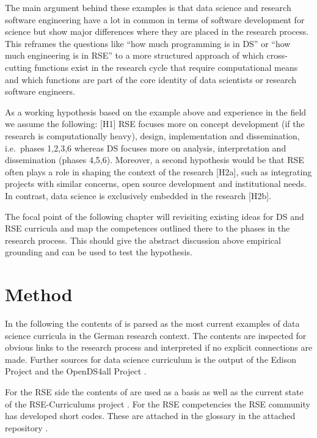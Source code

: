 \documentclass[
        english,biblatex
    ]{lni}
\begin{document}
    The main argument behind these examples is that data science and
    research software engineering have a lot in common in terms of
    software development for science but show major differences where
    they are placed in the research process. This reframes the questions
    like ``how much programming is in DS'' or ``how much engineering is
    in RSE'' to a more structured approach of which cross-cutting
    functions exist in the research cycle that require computational
    means and which functions are part of the core identity of data
    scientists or research software engineers.

    As a working hypothesis based on the example above and experience in
    the field we assume the following: {[}H1{]} RSE focuses more on
    concept development (if the research is computationally heavy),
    design, implementation and dissemination, i.e.~phases 1,2,3,6
    whereas DS focuses more on analysis, interpretation and
    dissemination (phases 4,5,6). Moreover, a second hypothesis would be
    that RSE often plays a role in shaping the context of the research
    {[}H2a{]}, such as integrating projects with similar concerns, open
    source development and institutional needs. In contrast, data
    science is exclusively embedded in the research {[}H2b{]}.

    The focal point of the following chapter will revisiting existing
    ideas for DS and RSE curricula and map the competences outlined
    there to the phases in the research process. This should give the
    abstract discussion above empirical grounding and can be used to
    test the hypothesis.

    \section{Method}\label{method}

    In the following the contents of \autocite{GI2021DataScience} is
    parsed as the most current examples of data science curricula in the
    German research context. The contents are inspected for obvious
    links to the research process and interpreted if no explicit
    connections are made. Further sources for data science curriculum is
    the output of the Edison Project \autocite{EDSF2017} and the
    OpenDS4all Project \autocite{OpenDS4All2020}.

    For the RSE side the contents of \autocite{Goth2024RSE} are used as
    a basis as well as the current state of the RSE-Curriculums project
    \autocite{RSECurriculums2021}. For the RSE competencies the RSE
    community has developed short codes. These are attached in the
    glossary in the attached repository \autocite{ds2rse2025}.
\end{document}
